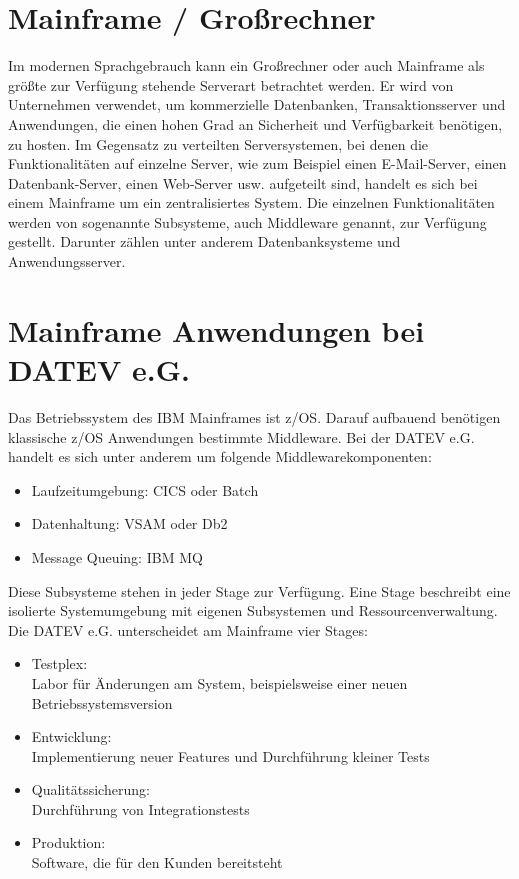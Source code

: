 \section{Mainframe / Großrechner}\label{sec:mainframe}
Im modernen Sprachgebrauch kann ein Großrechner oder auch Mainframe als größte zur Verfügung stehende Serverart betrachtet werden.
Er wird von Unternehmen verwendet, um  kommerzielle Datenbanken, Transaktionsserver und Anwendungen, die einen hohen Grad an Sicherheit und Verfügbarkeit benötigen, zu hosten.
Im Gegensatz zu verteilten Serversystemen, bei denen die Funktionalitäten auf einzelne Server, wie zum Beispiel einen E-Mail-Server, einen Datenbank-Server, einen Web-Server usw. aufgeteilt sind, handelt es sich bei einem Mainframe um ein zentralisiertes System.
Die einzelnen Funktionalitäten werden von sogenannte \glqq Subsysteme\grqq, auch \glqq Middleware\grqq{} genannt, zur Verfügung gestellt.
Darunter zählen unter anderem Datenbanksysteme und Anwendungsserver.
\cite{Ebbers.2011}

\section{Mainframe Anwendungen bei DATEV e.G.}\label{sec:zosanw}
Das Betriebssystem des IBM Mainframes ist z/OS.
Darauf aufbauend benötigen klassische z/OS Anwendungen bestimmte Middleware.
Bei der DATEV e.G. handelt es sich unter anderem um folgende Middlewarekomponenten:

\begin{itemize}
\item Laufzeitumgebung: CICS oder Batch
\item Datenhaltung: VSAM oder Db2
\item Message Queuing: IBM MQ
\end{itemize}

Diese Subsysteme stehen in jeder Stage zur Verfügung.
Eine Stage beschreibt eine isolierte Systemumgebung mit eigenen Subsystemen und Ressourcenverwaltung.
Die DATEV e.G. unterscheidet am Mainframe vier Stages:
\begin{samepage}
\begin{itemize}
\item Testplex:\\
Labor für Änderungen am System, beispielsweise einer neuen Betriebssystemsversion
\item Entwicklung:\\
Implementierung neuer Features und Durchführung kleiner Tests
\item Qualitätssicherung:\\
Durchführung von Integrationstests
\item Produktion:\\
Software, die für den Kunden bereitsteht
\end{itemize}
\end{samepage}

